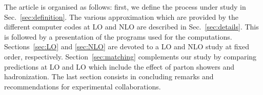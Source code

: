 The article is organised as follows:
first, we define the process under study in Sec.~\ref{sec:definition}.
The various approximation which are provided by the different computer codes at LO and NLO are described in Sec.~\ref{sec:details}.
This is followed by a presentation of the programs used for the computations.
Sections~\ref{sec:LO} and \ref{sec:NLO} are devoted to a LO and NLO study at fixed order, respectively.
Section~\ref{sec:matching} complements our study by comparing predictions at LO and LO which include the effect of parton showers and hadronization.
The last section consists in concluding remarks and recommendations for experimental collaborations.
